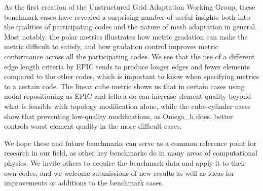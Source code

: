 \documentclass[3p,times,procedia,number]{elsarticle}
\begin{document}
As the first creation of the Unstructured Grid Adaptation Working Group, these benchmark cases have revealed
a surprising number of useful insights both into the qualities of participating codes and the
nature of mesh adaptation in general.
Most notably, the polar metrics illustrates how metric gradation can make the metric difficult to satisfy,
and how gradation control improves metric conformance across all the participating codes.
We see that the use of a different edge length criteria by EPIC tends to produce longer edges
and fewer elements compared to the other codes,
which is important to know when specifying metrics to a certain code.
The linear cube metric shows us that in certain cases using nodal repositioning as EPIC and feflo.a do can increase element quality
beyond what is feasible with topology modification alone,
while the cube-cylinder cases show that preventing low-quality modifications, as Omega\_h does, better
controls worst element quality in the more difficult cases.

We hope these and future benchmarks can serve as a common reference point for research in our field,
as other key benchmarks do in many areas of computational physics.
We invite others to acquire the benchmark data
and apply it to their own codes, and we welcome submissions of new results as well
as ideas for improvements or additions to the benchmark cases.



\end{document}
